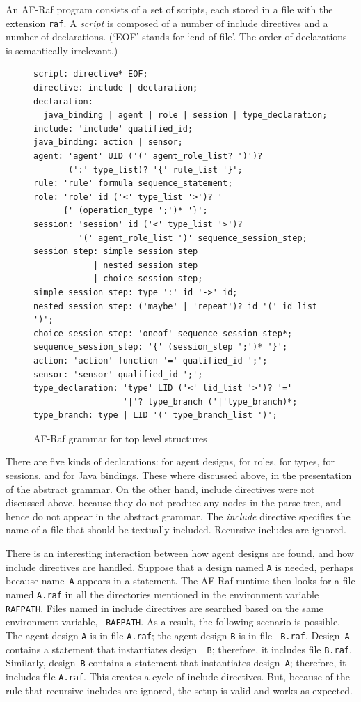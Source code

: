 \documentclass[a4paper,12pt,oneside,fleqn]{book} %
\begin{document}
{An AF-Raf program consists of a set of scripts, each stored in a file with
the extension {\tt raf}.  A {\it script\/} is composed of a number of
include directives and a number of declarations. (`EOF' stands for `end of
file'. The order of declarations is semantically irrelevant.)

\begin{figure}\footnotesize %
\begin{verbatim}
script: directive* EOF;
directive: include | declaration;
declaration:
  java_binding | agent | role | session | type_declaration;
include: 'include' qualified_id;
java_binding: action | sensor;
agent: 'agent' UID ('(' agent_role_list? ')')?
       (':' type_list)? '{' rule_list '}';
rule: 'rule' formula sequence_statement;
role: 'role' id ('<' type_list '>')? '
      {' (operation_type ';')* '}';
session: 'session' id ('<' type_list '>')?
         '(' agent_role_list ')' sequence_session_step;
session_step: simple_session_step
            | nested_session_step
            | choice_session_step;
simple_session_step: type ':' id '->' id;
nested_session_step: ('maybe' | 'repeat')? id '(' id_list ')';
choice_session_step: 'oneof' sequence_session_step*;
sequence_session_step: '{' (session_step ';')* '}';
action: 'action' function '=' qualified_id ';';
sensor: 'sensor' qualified_id ';';
type_declaration: 'type' LID ('<' lid_list '>')? '='
                  '|'? type_branch ('|'type_branch)*;
type_branch: type | LID '(' type_branch_list ')';
\end{verbatim}
\caption{AF-Raf grammar for top level structures}
\label{fig:grammar-top-level}
\end{figure} %

There are five kinds of declarations: for agent designs, for roles, for
types, for sessions, and for Java bindings. These where discussed above, in
the presentation of the abstract grammar. On the other hand, include
directives were not discussed above, because they do not produce any nodes
in the parse tree, and hence do not appear in the abstract grammar.  The
{\it include} directive specifies the name of a file that should be
textually included. Recursive includes are ignored.

There is an interesting interaction between how agent designs are found,
and how include directives are handled. Suppose that a design named {\tt A}
is needed, perhaps because name~{\tt A} appears in a statement. The AF-Raf
runtime then looks for a file named {\tt A.raf} in all the directories
mentioned in the environment variable {\tt RAFPATH}. Files named in include
directives are searched based on the same environment variable, {\tt
RAFPATH}. As a result, the following scenario is possible. The agent design
{\tt A} is in file {\tt A.raf}; the agent design {\tt B} is in file {\tt
B.raf}. Design~{\tt A} contains a statement that instantiates design~{\tt
B}; therefore, it includes file {\tt B.raf}. Similarly, design~{\tt B}
contains a statement that instantiates design~{\tt A}; therefore, it
includes file {\tt A.raf}. This creates a cycle of include directives.
But, because of the rule that recursive includes are ignored, the setup is
valid and works as expected.

}
\end{document}
